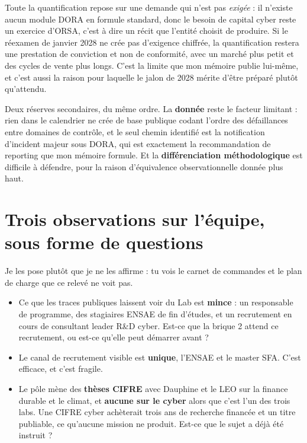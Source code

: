 \documentclass[11pt,a4paper]{article}
\begin{document}
Toute la quantification repose sur une demande qui n'est pas \emph{exigée} : il n'existe aucun
module DORA en formule standard, donc le besoin de capital cyber reste un exercice d'ORSA, c'est
à dire un récit que l'entité choisit de produire. Si le réexamen de janvier 2028 ne crée pas
d'exigence chiffrée, la quantification restera une prestation de conviction et non de
conformité, avec un marché plus petit et des cycles de vente plus longs. C'est la limite que mon
mémoire publie lui-même, et c'est aussi la raison pour laquelle le jalon de 2028 mérite d'être
préparé plutôt qu'attendu.

Deux réserves secondaires, du même ordre. La \textbf{donnée} reste le facteur limitant : rien
dans le calendrier ne crée de base publique codant l'ordre des défaillances entre domaines de
contrôle, et le seul chemin identifié est la notification d'incident majeur sous DORA, qui est
exactement la recommandation de reporting que mon mémoire formule. Et la
\textbf{différenciation méthodologique} est difficile à défendre, pour la raison d'équivalence
observationnelle donnée plus haut.

\section{Trois observations sur l'équipe, sous forme de questions}

Je les pose plutôt que je ne les affirme : tu vois le carnet de commandes et le plan de charge
que ce relevé ne voit pas.

\begin{itemize}
\item Ce que les traces publiques laissent voir du Lab est \textbf{mince} : un responsable de
      programme, des stagiaires ENSAE de fin d'études, et un recrutement en cours de consultant
      leader R\&D cyber. Est-ce que la brique 2 attend ce recrutement, ou est-ce qu'elle peut
      démarrer avant ?
\item Le canal de recrutement visible est \textbf{unique}, l'ENSAE et le master SFA. C'est
      efficace, et c'est fragile.
\item Le pôle mène des \textbf{thèses CIFRE} avec Dauphine et le LEO sur la finance durable et
      le climat, et \textbf{aucune sur le cyber} alors que c'est l'un des trois labs. Une CIFRE
      cyber achèterait trois ans de recherche financée et un titre publiable, ce qu'aucune
      mission ne produit. Est-ce que le sujet a déjà été instruit ?
\end{itemize}
\end{document}
